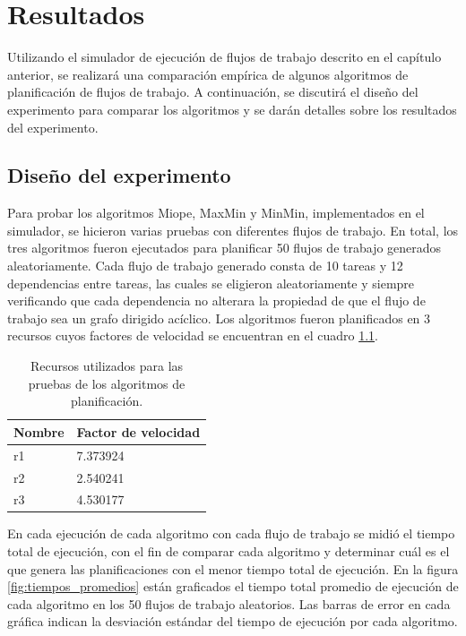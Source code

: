 \chapter{Resultados}


Utilizando el simulador de ejecución de flujos de trabajo descrito en el capítulo anterior, se realizará una comparación empírica de algunos algoritmos de planificación de flujos de trabajo. A continuación, se discutirá el diseño del experimento para comparar los algoritmos y se darán detalles sobre los resultados del experimento.

\section{Diseño del experimento}

Para probar los algoritmos Miope, MaxMin y MinMin, implementados en el simulador, se hicieron varias pruebas con diferentes flujos de trabajo. En total, los tres algoritmos fueron ejecutados para planificar 50 flujos de trabajo generados aleatoriamente. Cada flujo de trabajo generado consta de 10 tareas y 12 dependencias entre tareas, las cuales se eligieron aleatoriamente y siempre verificando que cada dependencia no alterara la propiedad de que el flujo de trabajo sea un grafo dirigido acíclico. Los algoritmos fueron planificados en 3 recursos cuyos factores de velocidad se encuentran en el cuadro \ref{table:resources}.

\begin{table}
\begin{center}
\begin{tabular}{|l|l|}
\hline
Nombre&Factor de velocidad\\
\hline
r1&7.373924\\
\hline
r2&2.540241\\
\hline
r3&4.530177\\
\hline
\end{tabular}
\end{center}
\label{table:resources}
\caption{Recursos utilizados para las pruebas de los algoritmos de planificación.}
\end{table}

En cada ejecución de cada algoritmo con cada flujo de trabajo se midió el tiempo total de ejecución, con el fin de comparar cada algoritmo y determinar cuál es el que genera las planificaciones con el menor tiempo total de ejecución. En la figura \ref{fig:tiempos_promedios} están graficados el tiempo total promedio de ejecución de cada algoritmo en los 50 flujos de trabajo aleatorios. Las barras de error en cada gráfica indican la desviación estándar del tiempo de ejecución por cada algoritmo.

